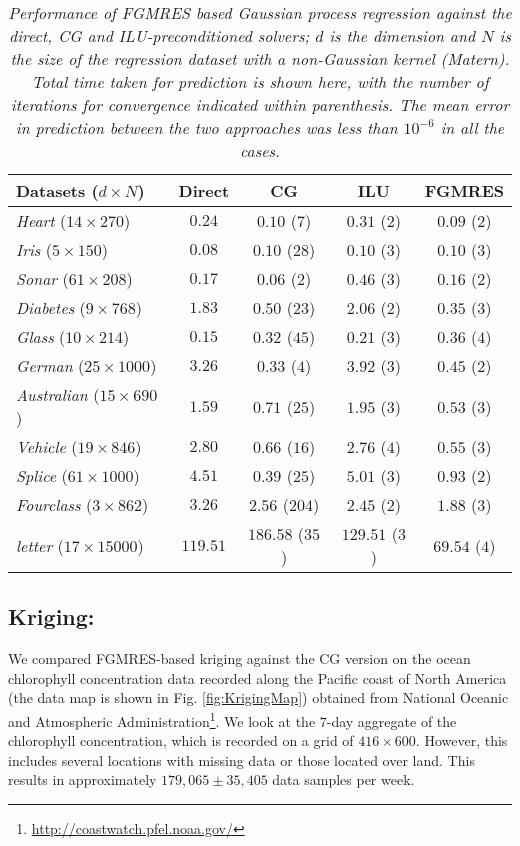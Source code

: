 \documentclass[10pt,journal,letterpaper,compsoc]{IEEEtran}
\begin{document}
\begin{table*}[bth]
\caption{\emph{Performance of FGMRES based Gaussian process regression against the direct, CG \cite{GPML_Mackay} and ILU-preconditioned solvers; $d$ is the dimension and $N$ is the size of the regression dataset with a non-Gaussian kernel (Matern). Total time taken for prediction is shown here, with the number of iterations for convergence indicated within parenthesis. The mean error in prediction between the two approaches was less than $10^{-6}$ in all the cases.}\label{table:fgmres_rlsc}}
\centering
\begin{tabular}{||l|c|c|c|c||}
\hline\hline
Datasets ($d\times N$)	& Direct \cite{GPML_Rasmussen} & CG \cite{GPML_Mackay} 	& ILU & FGMRES\\
\hline\hline
\emph{Heart} ($14 \times 270$)	& $0.24$ 	& $0.10$ ($7$) 	& $0.31$ ($2$) 	& $\mathbf{0.09}$ (${2}$)\\
\emph{Iris} ($5 \times 150$)	& $\mathbf{0.08}$ 	& $0.10$ ($28$) 	& $0.10$ ($3$) 	& $0.10$ (${3}$)\\
\emph{Sonar} ($61 \times 208$)	& $0.17$ 	& $\mathbf{0.06}$ ($2$) 	& $0.46$ (${3}$) 	& $0.16$ (${2}$)\\
\emph{Diabetes} ($9 \times 768$)	& $1.83$ 	& $0.50$ ($23$) 	& $2.06$ (${2}$) 	& $\mathbf{0.35}$ ($3$)\\
\emph{Glass} ($10 \times 214$)	& $\mathbf{0.15}$ 	& $0.32$ ($45$) 	& $0.21$ ($3$) 	& $0.36$ (${4}$)\\
\emph{German} ($25 \times 1000$)	& $3.26$ 	& $\mathbf{0.33}$ ($4$) 	& $3.92$ ($3$) 	& $0.45$ (${2}$)\\
\emph{Australian} ($15 \times 690$)	& $1.59$ 	& $0.71$ ($25$) 	& $1.95$ ($3$) 	& $\mathbf{0.53}$ (${3}$)\\
\emph{Vehicle} ($19 \times 846$)	& $2.80$ 	& $0.66$ ($16$) 	& $2.76$ ($4$) 	& $\mathbf{0.55}$ (${3}$)\\
\emph{Splice} ($61 \times 1000$)	& $4.51$ 	& $\mathbf{0.39}$ ($25$) 	& $5.01$ ($3$) 	& $0.93$ (${2}$)\\
\emph{Fourclass} ($3 \times 862$)	& $3.26$ 	& $2.56$ ($204$) 	& $2.45$ ($2$) 	& $\mathbf{1.88}$ (${3}$)\\
\emph{letter} ($17 \times 15000$)	& $119.51$ 	& $186.58$ ($35$) 	& $129.51$ ($3$) 	& $\mathbf{69.54}$ (${4}$)\\
\hline\hline
\end{tabular}
\end{table*}

\subsection{Kriging: }We compared FGMRES-based kriging against the CG version on the ocean chlorophyll concentration data recorded along the Pacific coast of North America (the data map is shown in Fig. \ref{fig:KrigingMap}) obtained from National Oceanic and Atmospheric Administration\footnote{\url{http://coastwatch.pfel.noaa.gov/}}. We look at the $7$-day aggregate of the chlorophyll concentration, which is recorded on a grid of $416\times600$. However, this includes several locations with missing data or those located over land. This results in approximately $179,065\pm35,405$ data samples per week.
\end{document}
